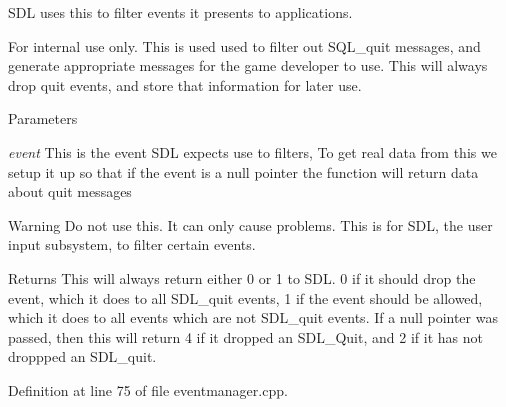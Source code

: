 SDL uses this to filter events it presents to applications. 

\begin{DoxyInternal}{For internal use only.}
This is used used to filter out SQL\_\-quit messages, and generate appropriate messages for the game developer to use. This will always drop quit events, and store that information for later use. 
\begin{DoxyParams}{Parameters}
\item[{\em event}]This is the event SDL expects use to filters, To get real data from this we setup it up so that if the event is a null pointer the function will return data about quit messages \end{DoxyParams}
\begin{DoxyWarning}{Warning}
Do not use this. It can only cause problems. This is for SDL, the user input subsystem, to filter certain events. 
\end{DoxyWarning}
\begin{DoxyReturn}{Returns}
This will always return either 0 or 1 to SDL. 0 if it should drop the event, which it does to all SDL\_\-quit events, 1 if the event should be allowed, which it does to all events which are not SDL\_\-quit events. If a null pointer was passed, then this will return 4 if it dropped an SDL\_\-Quit, and 2 if it has not droppped an SDL\_\-quit. 
\end{DoxyReturn}
\end{DoxyInternal}


Definition at line 75 of file eventmanager.cpp.


